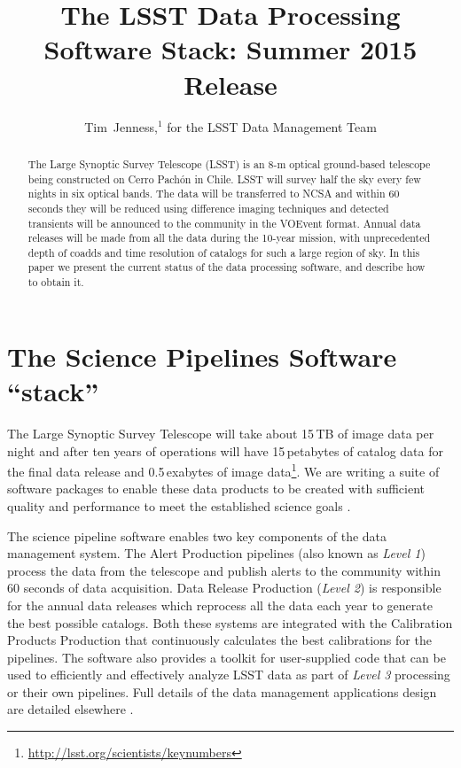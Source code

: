 \documentclass[11pt,twoside]{article}
\begin{document}
\title{The LSST Data Processing Software Stack: Summer 2015 Release}
\author{Tim~Jenness,$^1$ for the LSST Data Management Team
}


\begin{abstract}
  The Large Synoptic Survey Telescope (LSST) is an 8-m optical
  ground-based telescope being constructed on Cerro Pach\'on in
  Chile. LSST will survey half the sky every few nights in six optical
  bands. The data will be transferred to NCSA and within 60 seconds
  they will be reduced using difference imaging techniques and
  detected transients will be announced to the community in the
  VOEvent format. Annual data releases will be made from all the data
  during the 10-year mission, with unprecedented depth of coadds and
  time resolution of catalogs for such a large region of sky. In this
  paper we present the current status of the data processing software,
  and describe how to obtain it.
\end{abstract}

\section{The Science Pipelines Software ``stack''}

The Large Synoptic Survey Telescope
\citep[LSST;][]{2008arXiv0805.2366I} will take about 15\,TB of image
data per night and after ten years of operations will have
15\,petabytes of catalog data for the final data release and
0.5\,exabytes of image
data\footnote{\url{http://lsst.org/scientists/keynumbers}}. We are
writing a suite of software packages to enable these data products to
be created with sufficient quality and performance to meet the
established science goals \citep{2009arXiv0912.0201L}.

The science pipeline software enables two key components of the data
management system. The Alert Production pipelines (also known as
\emph{Level 1}) process the data from the telescope and publish alerts
to the community within 60 seconds of data acquisition. Data Release
Production (\emph{Level 2}) is responsible for the annual data
releases which reprocess all the data each year to generate the best
possible catalogs. Both these systems are integrated with the
Calibration Products Production that continuously calculates the best
calibrations for the pipelines. The software also provides a toolkit
for user-supplied code that can be used to efficiently and effectively
analyze LSST data as part of \emph{Level 3} processing or their own
pipelines. Full details of the data management applications design are
detailed elsewhere \citep{O3-1_adassxxv,LDM-151}.
\end{document}
